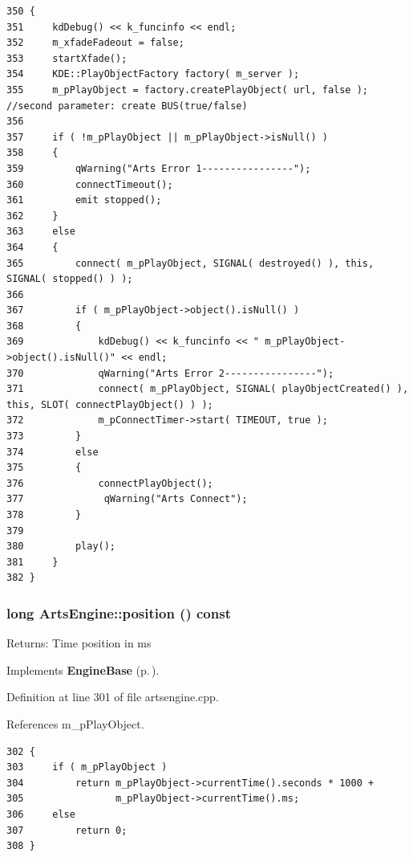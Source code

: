\footnotesize\begin{verbatim}350 {
351     kdDebug() << k_funcinfo << endl;
352     m_xfadeFadeout = false;
353     startXfade();
354     KDE::PlayObjectFactory factory( m_server );
355     m_pPlayObject = factory.createPlayObject( url, false ); //second parameter: create BUS(true/false)
356 
357     if ( !m_pPlayObject || m_pPlayObject->isNull() ) 
358     {
359         qWarning("Arts Error 1----------------");
360         connectTimeout();
361         emit stopped();
362     }
363     else
364     {      
365         connect( m_pPlayObject, SIGNAL( destroyed() ), this, SIGNAL( stopped() ) );
366 
367         if ( m_pPlayObject->object().isNull() ) 
368         {
369             kdDebug() << k_funcinfo << " m_pPlayObject->object().isNull()" << endl;
370             qWarning("Arts Error 2----------------");
371             connect( m_pPlayObject, SIGNAL( playObjectCreated() ), this, SLOT( connectPlayObject() ) );
372             m_pConnectTimer->start( TIMEOUT, true );
373         }
374         else 
375         {
376             connectPlayObject();
377              qWarning("Arts Connect");
378         }
379 
380         play();
381     }
382 }
\end{verbatim}\normalsize 
{}
\subsubsection{\setlength{\rightskip}{0pt plus 5cm}long Arts\-Engine::position () const\hspace{0.3cm}{\tt  [virtual]}}\label{classArtsEngine_ArtsEnginea6}


\begin{Desc}
\item[Returns:]Time position in ms \end{Desc}


Implements {\bf Engine\-Base} {\rm (p.\,\pageref{classEngineBase_EngineBasea7})}.

Definition at line 301 of file artsengine.cpp.

References m\_\-p\-Play\-Object.



\footnotesize\begin{verbatim}302 {
303     if ( m_pPlayObject )
304         return m_pPlayObject->currentTime().seconds * 1000 +
305                m_pPlayObject->currentTime().ms;
306     else
307         return 0;
308 }
\end{verbatim}\normalsize 
{}
